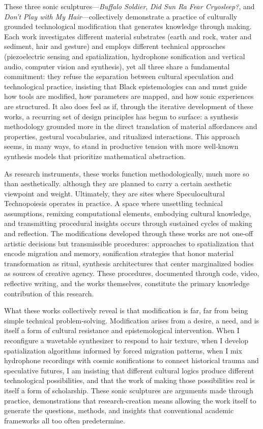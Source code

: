 These three sonic sculptures—\emph{Buffalo Soldier}, \emph{Did Sun Ra Fear Cryosleep?}, and \emph{Don't Play with My Hair}—collectively demonstrate a practice of culturally grounded technological modification that generates knowledge through making. Each work investigates different material substrates (earth and rock, water and sediment, hair and gesture) and employs different technical approaches (piezoelectric sensing and spatialization, hydrophone sonification and vertical audio, computer vision and synthesis), yet all three share a fundamental commitment: they refuse the separation between cultural speculation and technological practice, insisting that Black epistemologies can and must guide how tools are modified, how parameters are mapped, and how sonic experiences are structured. It also does feel as if, through the iterative development of these works, a recurring set of design principles has begun to surface: a synthesis methodology grounded more in the direct translation of material affordances and properties, gestural vocabularies, and ritualized interactions. This approach seems, in many ways, to stand in productive tension with more well-known synthesis models that prioritize mathematical abstraction.

As research instruments, these works function methodologically, much more so than aesthetically. although they are planned to carry a certain aesthetic viewpoint and weight. Ultimately, they are sites where Speculocultural Technopoiesis operates in practice. A space where unsettling technical assumptions, remixing computational elements, embodying cultural knowledge, and transmitting procedural insights occurs through sustained cycles of making and reflection. The modifications developed through these works are not one-off artistic decisions but transmissible procedures: approaches to spatialization that encode migration and memory, sonification strategies that honor material transformation as ritual, synthesis architectures that center marginalized bodies as sources of creative agency. These procedures, documented through code, video, reflective writing, and the works themselves, constitute the primary knowledge contribution of this research.

What these works collectively reveal is that modification is far, far from being simple technical problem-solving. Modification arises from a desire, a need, and is itself a form of cultural resistance and epistemological intervention. When I reconfigure a wavetable synthesizer to respond to hair texture, when I develop spatialization algorithms informed by forced migration patterns, when I mix hydrophone recordings with cosmic sonifications to connect historical trauma and speculative futures, I am insisting that different cultural logics produce different technological possibilities, and that the work of making those possibilities real is itself a form of scholarship. These sonic sculptures are arguments made through practice, demonstrations that research-creation means allowing the work itself to generate the questions, methods, and insights that conventional academic frameworks all too often predetermine.